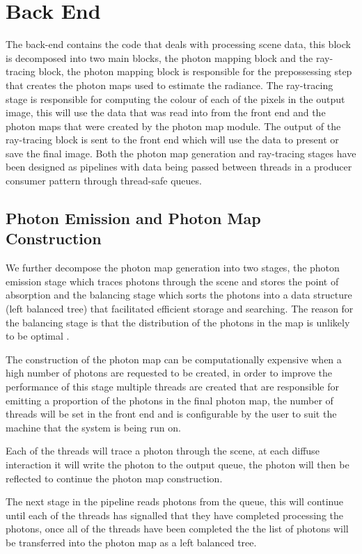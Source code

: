 \section{Back End}
The back-end contains the code that deals with processing scene data, this block is decomposed into
two main blocks, the photon mapping block and the ray-tracing block, the photon mapping block is responsible
for the prepossessing step that creates the photon maps used to estimate the radiance. The ray-tracing stage
is responsible for computing the colour of each of the pixels in the output image, this will use the data
that was read into from the front end and the photon maps that were created by the photon map module. The
output of the ray-tracing block is sent to the front end which will use the data to present or save the final
image. Both the photon map generation and ray-tracing stages have been designed as pipelines with data being passed
between threads in a producer consumer pattern through thread-safe queues.

\subsection{Photon Emission and Photon Map Construction}
We further decompose the photon map generation into two stages, the photon emission stage which traces photons
through the scene and stores the point of absorption and the balancing stage which sorts the photons into
a data structure (left balanced tree) that facilitated efficient storage and searching.
The reason for the balancing stage is that the distribution of the photons in the map is unlikely to be
optimal \cite{JensenBook}.

The construction of the photon map can be computationally expensive when a high number of photons are
requested to be created, in order to improve the performance of this stage multiple threads are created
that are responsible for emitting a proportion of the photons in the final photon map, the number of threads will be
set in the front end and is configurable by the user to suit the machine that the system is being run on.

Each of the threads will trace a photon through the scene, at each diffuse interaction it will write the
photon to the output queue, the photon will then be reflected to continue the photon map construction.

The next stage in the pipeline reads photons from the queue, this will continue until each of the threads
has signalled that they have completed processing the photons, once all of the threads have been completed the
the list of photons will be transferred into the photon map as a left balanced tree.

